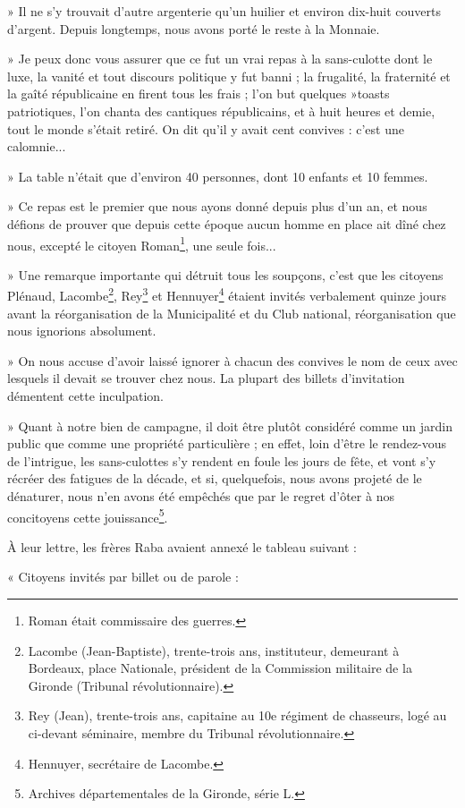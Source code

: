 » Il ne s'y trouvait d'autre argenterie qu'un huilier et environ dix-huit couverts d'argent. Depuis longtemps, nous avons porté le reste à la Monnaie.

» Je peux donc vous assurer que ce fut un vrai repas à la sans-culotte dont le luxe, la vanité et tout discours politique y fut banni ; la frugalité, la fraternité et la gaîté républicaine en firent tous les frais ; l'on but quelques »toasts patriotiques, l'on chanta des cantiques républicains, et à huit heures et demie, tout le monde s'était retiré. On dit qu'il y avait cent convives : c'est une calomnie...

» La table n'était que d'environ 40 personnes, dont 10 enfants et 10 femmes.

» Ce repas est le premier que nous ayons donné depuis plus d'un an, et nous défions de prouver que depuis cette époque aucun homme en place ait dîné chez nous, excepté le citoyen Roman\footnote{Roman était commissaire des guerres.}, une seule fois...

» Une remarque importante qui détruit tous les soupçons, c'est que les citoyens Plénaud, Lacombe\footnote{Lacombe (Jean-Baptiste), trente-trois ans, instituteur, demeurant à Bordeaux, place Nationale, président de la Commission militaire de la Gironde (Tribunal révolutionnaire).}, Rey\footnote{Rey (Jean), trente-trois ans, capitaine au 10e régiment de chasseurs, logé au ci-devant séminaire, membre du Tribunal révolutionnaire.} et Hennuyer\footnote{Hennuyer, secrétaire de Lacombe.} étaient invités verbalement quinze jours avant la réorganisation de la Municipalité et du Club national, réorganisation que nous ignorions absolument.

» On nous accuse d'avoir laissé ignorer à chacun des convives le nom de ceux avec lesquels il devait se trouver chez nous. La plupart des billets d'invitation démentent cette inculpation.

» Quant à notre bien de campagne, il doit être plutôt considéré comme un jardin public que comme une propriété particulière ; en effet, loin d'être le rendez-vous de l'intrigue, les sans-culottes s'y rendent en foule les jours de fête, et vont s'y récréer des fatigues de la décade, et si, quelquefois, nous avons projeté de le dénaturer, nous n'en avons été empêchés que par le regret d'ôter à nos concitoyens cette jouissance\footnote{Archives départementales de la Gironde, série L.}.

À leur lettre, les frères Raba avaient annexé le tableau suivant :

« Citoyens invités par billet ou de parole : 

